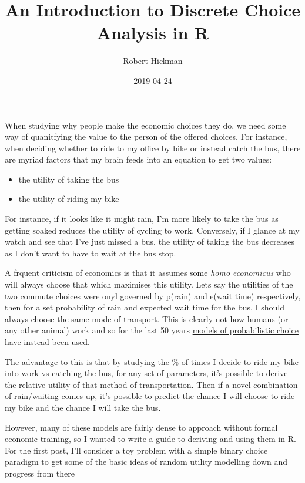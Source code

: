 \documentclass[]{article}
\title{An Introduction to Discrete Choice Analysis in R}
\author{Robert Hickman}
\date{2019-04-24}
\providecommand{\tightlist}{%
  \setlength{\itemsep}{0pt}\setlength{\parskip}{0pt}}
\begin{document}
\maketitle

When studying why people make the economic choices they do, we need some
way of quanitfying the value to the person of the offered choices. For
instance, when deciding whether to ride to my office by bike or instead
catch the bus, there are myriad factors that my brain feeds into an
equation to get two values:

\begin{itemize}
\tightlist
\item
  the utility of taking the bus
\item
  the utility of riding my bike
\end{itemize}

For instance, if it looks like it might rain, I'm more likely to take
the bus as getting soaked reduces the utility of cycling to work.
Conversely, if I glance at my watch and see that I've just missed a bus,
the utility of taking the bus decreases as I don't want to have to wait
at the bus stop.

A frquent criticism of economics is that it assumes some \emph{homo
economicus} who will always choose that which maximises this utility.
Lets say the utilities of the two commute choices were onyl governed by
p(rain) and e(wait time) respectively, then for a set probability of
rain and expected wait time for the bus, I should always choose the same
mode of transport. This is clearly not how humans (or any other animal)
work and so for the last 50 years
\href{https://eml.berkeley.edu/~mcfadden/discrete/ch5.pdf}{models of
probabilistic choice} have instead been used.

The advantage to this is that by studying the \% of times I decide to
ride my bike into work vs catching the bus, for any set of parameters,
it's possible to derive the relative utility of that method of
transportation. Then if a novel combination of rain/waiting comes up,
it's possible to predict the chance I will choose to ride my bike and
the chance I will take the bus.

However, many of these models are fairly dense to approach without
formal economic training, so I wanted to write a guide to deriving and
using them in R. For the first post, I'll consider a toy problem with a
simple binary choice paradigm to get some of the basic ideas of random
utility modelling down and progress from there
\end{document}

